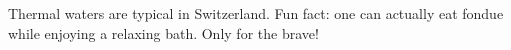 Thermal waters are typical in Switzerland.
Fun fact: one can actually eat fondue while enjoying a relaxing bath.
Only for the brave!